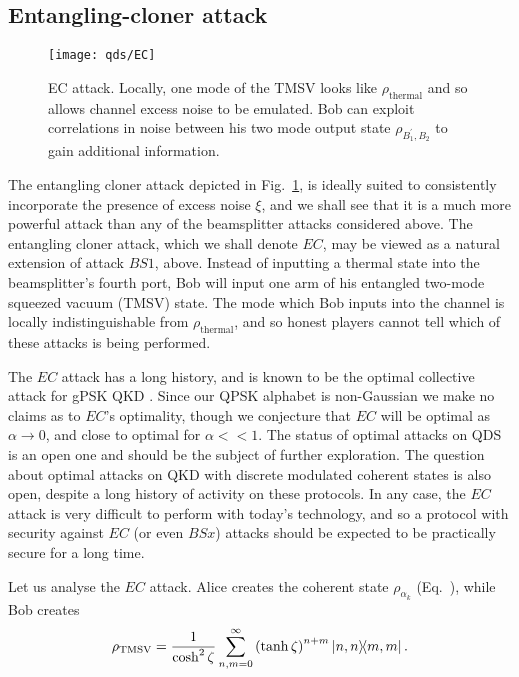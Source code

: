 \subsection{Entangling-cloner attack}
\begin{figure}[htp]
\centering
\texttt{[image: qds/EC]}
\caption{\label{fig:ec_attack} EC attack. Locally, one mode of the TMSV looks like $\rho_{\text{thermal}}$ and so allows channel excess noise to be emulated. Bob can exploit correlations in noise between his two mode output state $\rho_{B_1^\prime, B_2}$ to gain additional information.}
\end{figure}
The entangling cloner attack \cite{Grosshans2002, Grosshans2003} depicted in Fig.~\ref{fig:ec_attack}, is ideally suited to consistently incorporate the presence of excess noise $\xi$, and we shall see that it is a much more powerful attack than any of the beamsplitter attacks considered above. The entangling cloner attack, which we shall denote $EC$, may be viewed as a natural extension of attack $BS1$, above. Instead of inputting a thermal state into the beamsplitter's fourth port, Bob will input one arm of his entangled two-mode squeezed vacuum (TMSV) state. The mode which Bob inputs into the channel is locally indistinguishable from $\rho_{\text{thermal}}$, and so honest players cannot tell which of these attacks is being performed. 

The $EC$ attack has a long history, and is known to be the optimal collective attack for gPSK QKD . Since our QPSK alphabet is non-Gaussian we make no claims as to $EC$'s optimality, though we conjecture that $EC$ will be optimal as $\alpha \rightarrow 0$, and close to optimal for $\alpha << 1$. The status of optimal attacks on QDS is an open one and should be the subject of further exploration. The question about optimal attacks on QKD with discrete modulated coherent states is also open, despite a long history of activity on these protocols. In any case, the $EC$ attack is very difficult to perform with today's technology, and so a protocol with security against $EC$ (or even $BSx$) attacks should be expected to be practically secure for a long time.


Let us analyse the $EC$ attack. Alice creates the coherent state $\rho_{\alpha_k}$ (Eq.~), while Bob creates
\begin{equation}
\tmsv = \frac{1}{\cosh^2 \zeta}  \sum_{n, m=0}^\infty \left(\tanh\zeta\right)^{n+m} \dyad{n, n}{m, m}.
\end{equation}

